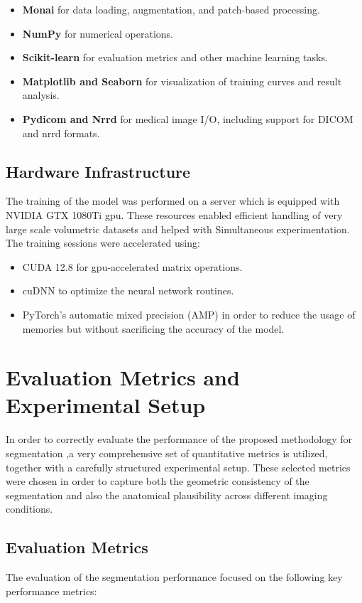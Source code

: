 \begin{itemize} \item \textbf{Monai} for data loading, augmentation, and patch-based processing. \item \textbf{NumPy} for numerical operations. \item \textbf{Scikit-learn} for evaluation metrics and other machine learning tasks. \item \textbf{Matplotlib and Seaborn} for visualization of training curves and result analysis. \item \textbf{Pydicom and Nrrd} for medical image I/O, including support for DICOM and nrrd formats. \end{itemize}

\subsection{Hardware Infrastructure}
The training of the model was performed on a server which is equipped with NVIDIA GTX 1080Ti \gls{gpu}. These resources enabled efficient handling of very large scale volumetric datasets and helped with Simultaneous experimentation. The training sessions were accelerated using:

\begin{itemize} \item CUDA 12.8 for \gls{gpu}-accelerated matrix operations. \item cuDNN to optimize the neural network routines. \item PyTorch's automatic mixed precision (AMP) in order to reduce the usage of memories but without sacrificing the accuracy of the model. \end{itemize}

\section{Evaluation Metrics and Experimental Setup}
In order to correctly evaluate the performance of the proposed methodology for segmentation ,a very comprehensive set of quantitative metrics is utilized, together with a carefully structured experimental setup. These selected metrics were chosen in order to capture both the geometric consistency of the segmentation and also the anatomical plausibility across different imaging conditions.

\subsection{Evaluation Metrics}
The evaluation of the segmentation performance focused on the following key performance metrics:

